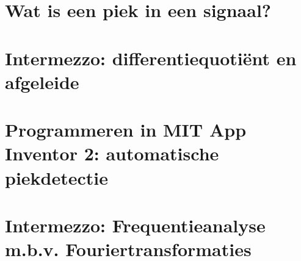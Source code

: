 
\begin{samenvatting}
\end{samenvatting}
%

\section{Wat is een piek in een signaal?}
\label{sec:Mod4_Sec1}
%

\section{Intermezzo: differentiequoti\"ent en afgeleide}
\label{sec:Mod4_Sec2}
%


\section{Programmeren in MIT App Inventor 2: automatische piekdetectie}
\label{sec:Mod4_Sec3}
%

\section{Intermezzo: Frequentieanalyse m.b.v. Fouriertransformaties}
\label{sec:Mod4_Sec4}
%
